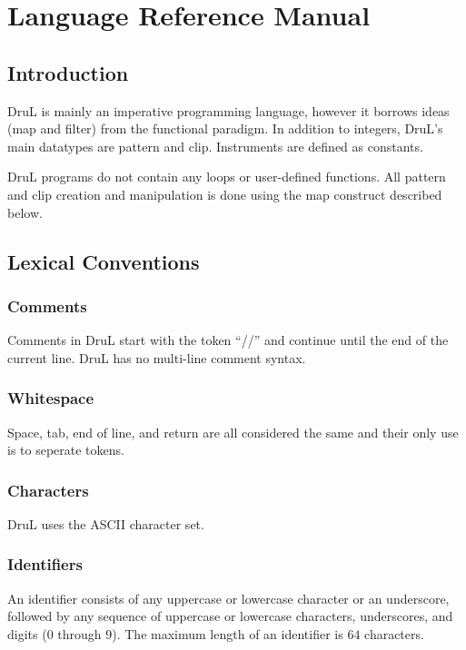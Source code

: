 \chapter{Language Reference Manual}
\section{Introduction}

DruL is mainly an imperative programming language, however it borrows ideas (map and filter) from the functional paradigm.  In addition to integers, DruL's main datatypes are pattern and clip. Instruments are defined as constants.

DruL programs do not contain any loops or user-defined functions.  All pattern
and clip creation and manipulation is done using the map construct described below.


\section{Lexical Conventions}

\subsection{Comments}

Comments in DruL start with the token ``//'' and continue until the end of the current line.
DruL has no multi-line comment syntax.

\subsection{Whitespace}

Space, tab, end of line, and return are all considered the same
and their only use is to seperate tokens.

\subsection{Characters}

DruL uses the ASCII character set.

\subsection{Identifiers}

An identifier consists of any uppercase or lowercase character
or an underscore, followed by any sequence of uppercase or lowercase characters,
underscores, and digits ($0$ through $9$). The maximum length of an identifier
is $64$ characters.

